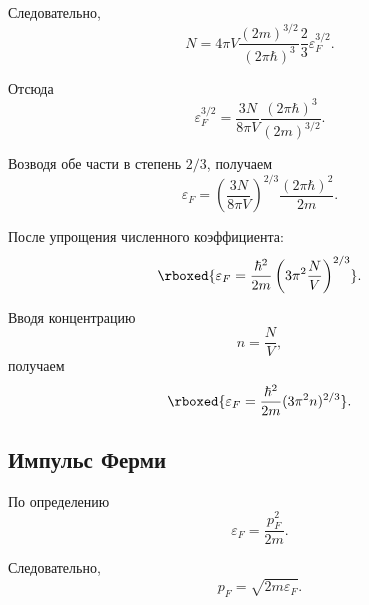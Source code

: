 \documentclass[../final.tex]{subfiles}
\begin{document}
Следовательно,
%
\begin{equation*}
    N
    =
    4\pi V
    \frac{
        (2m)^{3/2}
    }{
        (2\pi\hbar)^3
    }
    \frac{2}{3}
    \varepsilon_F^{3/2}.
\end{equation*}

Отсюда
%
\begin{equation*}
    \varepsilon_F^{3/2}
    =
    \frac{
        3N
    }{
        8\pi V
    }
    \frac{
        (2\pi\hbar)^3
    }{
        (2m)^{3/2}
    }.
\end{equation*}

Возводя обе части в степень $2/3$, получаем
%
\begin{equation*}
    \varepsilon_F
    =
    \left(
        \frac{
            3N
        }{
            8\pi V
        }
    \right)^{2/3}
    \frac{
        (2\pi\hbar)^2
    }{
        2m
    }.
\end{equation*}

После упрощения численного коэффициента:
%
\begin{equation*}
    \rboxed{
        \varepsilon_F
        =
        \frac{
            \hbar^2
        }{
            2m
        }
        \left(
            3\pi^2
            \frac{N}{V}
        \right)^{2/3}
    }.
\end{equation*}

Вводя концентрацию
%
\begin{equation*}
    n
    =
    \frac{N}{V},
\end{equation*}
%
получаем
%
\begin{equation*}
    \rboxed{
        \varepsilon_F
        =
        \frac{
            \hbar^2
        }{
            2m
        }
        (3\pi^2n)^{2/3}
    }.
\end{equation*}



\subsection*{Импульс Ферми}

По определению
%
\begin{equation*}
    \varepsilon_F
    =
    \frac{
        p_F^2
    }{
        2m
    }.
\end{equation*}

Следовательно,
%
\begin{equation*}
    p_F
    =
    \sqrt{
        2m\varepsilon_F
    }.
\end{equation*}
\end{document}
